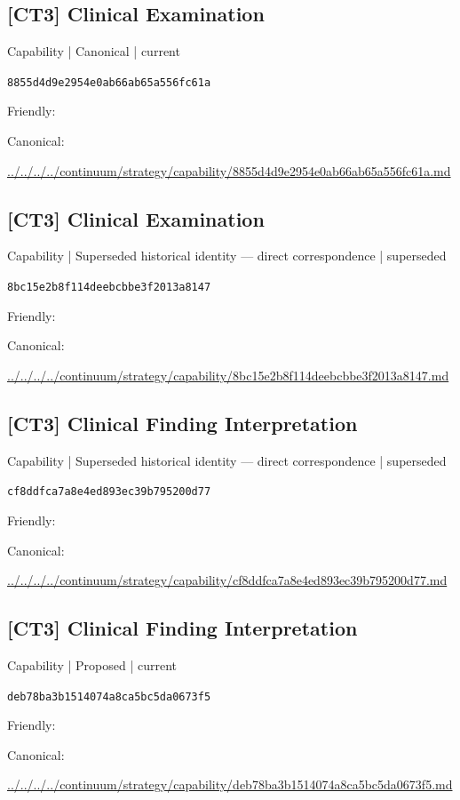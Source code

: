 \documentclass[10pt,a4paper]{article}
\begin{document}
\subsection*{[CT3] Clinical Examination}
{\small Capability | Canonical | current}\par
\texttt{8855d4d9e2954e0ab66ab65a556fc61a}\par
Friendly: \par
Canonical: \par
{\footnotesize\url{../../../../continuum/strategy/capability/8855d4d9e2954e0ab66ab65a556fc61a.md}}\par
\subsection*{[CT3] Clinical Examination}
{\small Capability | Superseded historical identity — direct correspondence | superseded}\par
\texttt{8bc15e2b8f114deebcbbe3f2013a8147}\par
Friendly: \par
Canonical: \par
{\footnotesize\url{../../../../continuum/strategy/capability/8bc15e2b8f114deebcbbe3f2013a8147.md}}\par
\subsection*{[CT3] Clinical Finding Interpretation}
{\small Capability | Superseded historical identity — direct correspondence | superseded}\par
\texttt{cf8ddfca7a8e4ed893ec39b795200d77}\par
Friendly: \par
Canonical: \par
{\footnotesize\url{../../../../continuum/strategy/capability/cf8ddfca7a8e4ed893ec39b795200d77.md}}\par
\subsection*{[CT3] Clinical Finding Interpretation}
{\small Capability | Proposed | current}\par
\texttt{deb78ba3b1514074a8ca5bc5da0673f5}\par
Friendly: \par
Canonical: \par
{\footnotesize\url{../../../../continuum/strategy/capability/deb78ba3b1514074a8ca5bc5da0673f5.md}}\par
\end{document}
